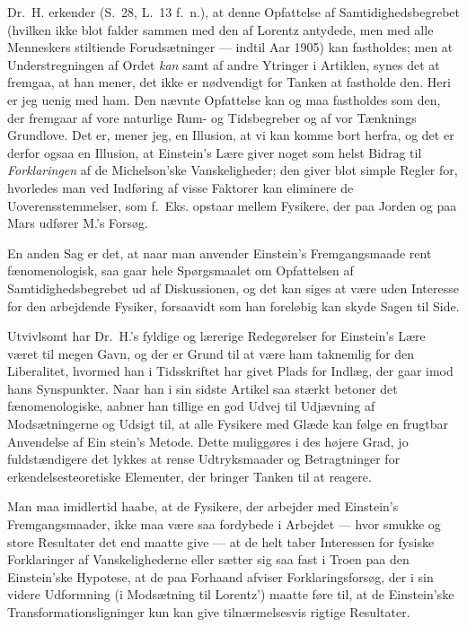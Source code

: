 \documentclass[12pt,a4paper]{article}
\newcommand{\opage}[1]{\marginnote{\footnotesize\textit{[#1]}}}
\begin{document}
Dr.~H. erkender (S.~28, L.~13 f.~n.), at denne Opfattelse af
Samtidighedsbegrebet (hvilken ikke blot falder sammen med den af Lorentz
antydede, men med alle Menneskers stiltiende Forudsætninger --- indtil Aar
1905) kan fastholdes; men at Understregningen af Ordet \emph{kan} samt af
andre Ytringer i Artiklen, synes det at fremgaa, at han mener, det ikke er
nødvendigt for Tanken at fastholde den. Heri er jeg uenig med ham. Den nævnte
Opfattelse kan og maa fastholdes som den, der fremgaar af vore naturlige
Rum- og Tidsbegreber og af vor Tænknings Grundlove. Det er, mener jeg, en
Illusion, at vi kan komme bort herfra, og det er derfor ogsaa en Illusion, at
Einstein's Lære giver noget som helst Bidrag til \emph{Forklaringen} af de
Michelson'ske Vanskeligheder; den giver blot simple Regler for, hvorledes man
ved Indføring af visse Faktorer kan eliminere de Uoverensstemmelser, som
f.~Eks. opstaar mellem Fysikere, der paa Jorden og paa Mars udfører M.'s
Forsøg.

En anden Sag er det, at naar man anvender Einstein's Fremgangsmaade rent
fænomenologisk, saa gaar hele Spørgsmaalet om Opfattelsen af
Samtidighedsbegrebet ud af Diskussionen, og det kan siges at være uden
Interesse for den arbejdende Fysiker, forsaavidt som han foreløbig kan skyde
Sagen til Side.

Utvivlsomt har Dr.~H.'s fyldige og lærerige Redegørelser for Einstein's Lære
været til megen Gavn, og der er Grund til at være ham taknemlig for den
Liberalitet, hvormed han i Tidsskriftet har givet Plads for Indlæg, der gaar
imod hans Synspunkter. Naar han i sin sidste Artikel saa stærkt betoner det
fænomenologiske, aabner han tillige en god Udvej til Udjævning af
Modsætningerne og Udsigt til, at alle Fysikere med Glæde kan følge en
frugtbar Anvendelse af Ein\-%
\opage{168}stein's Metode. Dette muliggøres i des højere Grad, jo fuldstændigere det
lykkes at rense Udtryksmaader og Betragtninger for erkendelsesteoretiske
Elementer, der bringer Tanken til at reagere.

Man maa imidlertid haabe, at de Fysikere, der arbejder med Einstein's
Fremgangsmaader, ikke maa være saa fordybede i Arbejdet --- hvor smukke og
store Resultater det end maatte give --- at de helt taber Interessen for
fysiske Forklaringer af Vanskelighederne eller sætter sig saa fast i Troen
paa den Einstein'ske Hypotese, at de paa Forhaand afviser Forklaringsforsøg,
der i sin videre Udformning (i Modsætning til Lorentz') maatte føre til, at
de Einstein'ske Transformationsligninger kun kan give tilnærmelsesvis rigtige
Resultater.
\end{document}
